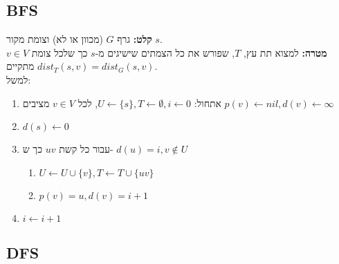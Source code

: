 \subsection*{BFS}
\textbf{קלט:}
גרף $G$ (מכוון או לא) וצומת מקור $s$.
\\
\textbf{מטרה:}
למצוא תת עץ, $T$, שפורש את כל הצמתים שישיגים מ-$s$ כך שלכל צומת 
$v \in V$
מתקיים
$dist_T(s, v) = dist_G(s, v)$.
\\
למשל:
\begin{center}
\end{center}

\begin{enumerate}
\item
אתחול:
$U \leftarrow \{s\}, T \leftarrow \emptyset, i \leftarrow 0$, 
לכל 
$v \in V$
מציבים
$p(v) \leftarrow nil, d(v) \leftarrow \infty$
\item
$d(s) \leftarrow 0$
\item
עבור כל קשת 
$uv$
כך ש-%
$d(u) = i, v \notin U$
	\begin{enumerate}
	\item
	$U \leftarrow U \cup \{v\}, T \leftarrow T \cup \{uv\}$
	\item
	$p(v) = u, d(v) = i + 1$
	\end{enumerate}
\item
$i \leftarrow i+1$
\end{enumerate}









\subsection*{DFS}

